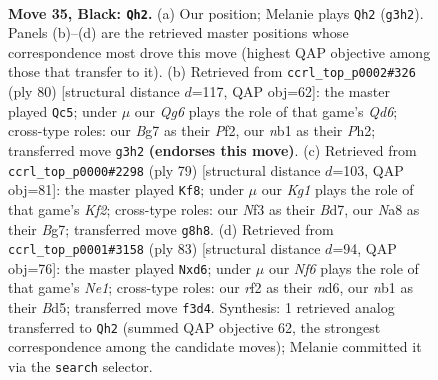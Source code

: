 \documentclass[11pt]{article}
\begin{document}
\clearpage

\begin{figure}[p]\centering
\begin{subfigure}{0.46\textwidth}\centering
\resizebox{\linewidth}{!}{%
\newchessgame
\chessboard[
  setfen={nr4k1/Q4pb1/R6B/4p3/4P3/1r3nq1/1P3RN1/1N3K2 b - - 1 35},
  showmover=false,
  pgfstyle=straightmove, color=movearrow, markmove={g3-h2}
]}
\caption{}
\end{subfigure}\hfill
\begin{subfigure}{0.46\textwidth}\centering
\resizebox{\linewidth}{!}{%
\newchessgame
\chessboard[
  setfen={2R2rk1/5r1p/3Q4/P5p1/4p3/4nbN1/1q3P1P/2R3K1 w - - 0 41},
  showmover=false,
  pgfstyle=straightmove, color=movearrow, markmove={d6-c5}
]}
\caption{}
\end{subfigure}
\\[4pt]
\begin{subfigure}{0.46\textwidth}\centering
\resizebox{\linewidth}{!}{%
\newchessgame
\chessboard[
  setfen={8/3b1kbQ/p2Pp1r1/q4p1B/1n6/2N5/1PP3r1/1K4RR b - - 5 40},
  showmover=false,
  pgfstyle=straightmove, color=movearrow, markmove={f7-f8}
]}
\caption{}
\end{subfigure}\hfill
\begin{subfigure}{0.46\textwidth}\centering
\resizebox{\linewidth}{!}{%
\newchessgame
\chessboard[
  setfen={4n1k1/4q1p1/3N2R1/3bpr2/pP3r2/6RP/4QPB1/6K1 b - - 0 42},
  showmover=false,
  pgfstyle=straightmove, color=movearrow, markmove={e8-d6}
]}
\caption{}
\end{subfigure}
\caption{\textbf{Move 35, Black: \texttt{Qh2}.} (a) Our position; Melanie plays \texttt{Qh2} (\texttt{g3h2}). Panels (b)--(d) are the retrieved master positions whose correspondence most drove this move (highest QAP objective among those that transfer to it). (b) Retrieved from \texttt{ccrl\_top\_p0002\#326} (ply 80) [structural distance $d$=117, QAP obj=62]: the master played \texttt{Qc5}; under $\mu$ our \emph{Qg6} plays the role of that game's \emph{Qd6}; cross-type roles: our \emph{B}g7 as their \emph{P}f2, our \emph{n}b1 as their \emph{P}h2; transferred move \texttt{g3h2} \textbf{(endorses this move)}. (c) Retrieved from \texttt{ccrl\_top\_p0000\#2298} (ply 79) [structural distance $d$=103, QAP obj=81]: the master played \texttt{Kf8}; under $\mu$ our \emph{Kg1} plays the role of that game's \emph{Kf2}; cross-type roles: our \emph{N}f3 as their \emph{B}d7, our \emph{N}a8 as their \emph{B}g7; transferred move \texttt{g8h8}. (d) Retrieved from \texttt{ccrl\_top\_p0001\#3158} (ply 83) [structural distance $d$=94, QAP obj=76]: the master played \texttt{Nxd6}; under $\mu$ our \emph{Nf6} plays the role of that game's \emph{Ne1}; cross-type roles: our \emph{r}f2 as their \emph{n}d6, our \emph{n}b1 as their \emph{B}d5; transferred move \texttt{f3d4}. Synthesis: 1 retrieved analog transferred to \texttt{Qh2} (summed QAP objective 62, the strongest correspondence among the candidate moves); Melanie committed it via the \texttt{search} selector.}
\label{fig:thought-m69}
\end{figure}
\end{document}
